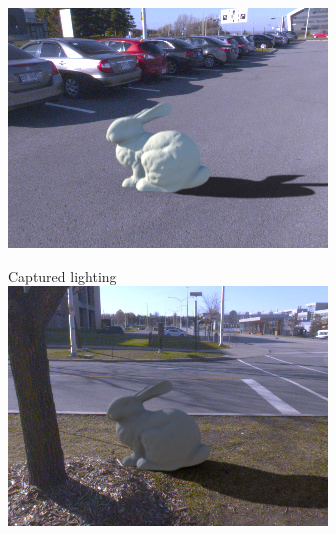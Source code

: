 \begin{minipage}{\linewidth}
\begin{multicols}{4}
\includegraphics[width=\mywidth]{AG8A2959_Panorama_hdr-corrected_006.jpg}















\vfill\null
\columnbreak

Captured lighting\\


\includegraphics[width=\mywidth]{AG8A2875_Panorama_hdr-corrected_011.jpg}


\end{multicols}
\end{minipage}
